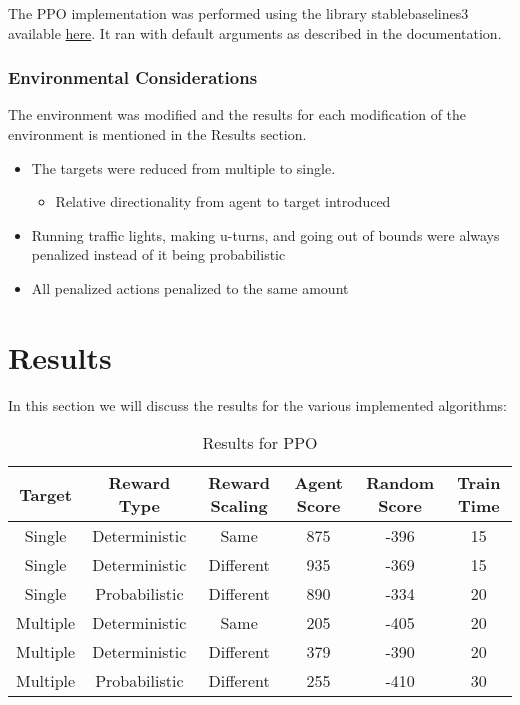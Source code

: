 \documentclass{article}
\begin{document}
The PPO implementation was performed using the library stable\textunderscore baselines3 available  \href{https://stable-baselines3.readthedocs.io/en/master/}{here}. It ran with default arguments as described in the documentation.

\subsubsection{Environmental Considerations}
\label{considerations}
The environment was modified and the results for each modification of the environment is mentioned in the Results section.
\begin{itemize}
	\item The targets were reduced from multiple to single. 
	\begin{itemize}
	\item Relative directionality from agent to target introduced
	\end{itemize}
	\item Running traffic lights, making u-turns, and going out of bounds were always penalized instead of it being probabilistic
	\item All penalized actions penalized to the same amount
\end{itemize}

\section{Results}
\label{results}
In this section we will discuss the results for the various implemented algorithms:

\begin{table*}[h]
	\centering
	\caption[]{Results for PPO}\label{Results for PPO}%
	\begin{tabular}{cccccc}
		\toprule
		Target & Reward Type & Reward Scaling\footnotemark[1] & Agent Score\footnotemark[2] & Random Score\footnotemark[2] & Train Time\footnotemark[3]\\
		\midrule
		Single &  Deterministic & Same & 875 & -396 & 15\\
		Single & Deterministic & Different\footnotemark[4] & 935 & -369 & 15\\
		Single & Probabilistic & Different & 890 & -334 & 20\\
		\midrule
		Multiple & Deterministic & Same & 205 & -405 & 20\\
		Multiple & Deterministic & Different & 379 & -390 & 20\\
		Multiple & Probabilistic & Different & 255 & -410 & 30\\
		\bottomrule
	\end{tabular}
	\label{tab: PPO_Table}
\end{table*}
\end{document}
